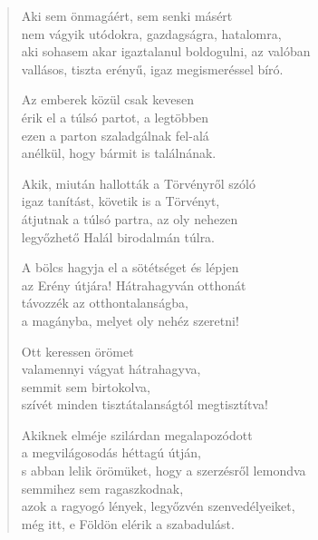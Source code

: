 \begin{verse}
 Aki sem önmagáért, sem senki másért\\
nem vágyik utódokra, gazdagságra, hatalomra,\\
aki sohasem akar igaztalanul boldogulni, az valóban\\
vallásos, tiszta erényű, igaz megismeréssel bíró.

 Az emberek közül csak kevesen\\
érik el a túlsó partot, a legtöbben\\
ezen a parton szaladgálnak fel-alá\\
anélkül, hogy bármit is találnának.

 Akik, miután hallották a Törvényről szóló\\
igaz tanítást, követik is a Törvényt,\\
átjutnak a túlsó partra, az oly nehezen\\
legyőzhető Halál birodalmán túlra.

 A bölcs hagyja el a sötétséget és lépjen\\
az Erény útjára! Hátrahagyván otthonát\\
távozzék az otthontalanságba,\\
a magányba, melyet oly nehéz szeretni!

 Ott keressen örömet\\
valamennyi vágyat hátrahagyva,\\
semmit sem birtokolva,\\
szívét minden tisztátalanságtól megtisztítva!

 Akiknek elméje szilárdan megalapozódott\\
a megvilágosodás héttagú útján,\\
s abban lelik örömüket, hogy a szerzésről lemondva\\
semmihez sem ragaszkodnak,\\
azok a ragyogó lények, legyőzvén szenvedélyeiket,\\
még itt, e Földön elérik a szabadulást.

\end{verse}

